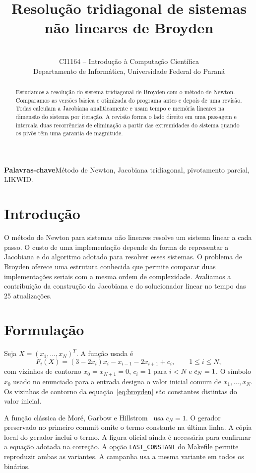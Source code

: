 \documentclass[11pt,a4paper]{article}
\title{\textbf{Resolução tridiagonal de sistemas\\não lineares de Broyden}}
\author{\Autores\ifx\Autores\empty\else\\[3pt]\fi
  \small CI1164 -- Introdução à Computação Científica\\
  \small Departamento de Informática, Universidade Federal do Paraná}
\date{\small\EstadoRelatorio}
\begin{document}
\maketitle

\begin{abstract}
Estudamos a resolução do sistema tridiagonal de Broyden com o método de Newton. Comparamos as versões básica e otimizada do programa antes e depois de uma revisão. Todas calculam a Jacobiana analiticamente e usam tempo e memória lineares na dimensão do sistema por iteração. A revisão forma o lado direito em uma passagem e intercala duas recorrências de eliminação a partir das extremidades do sistema quando os pivôs têm uma garantia de magnitude. \ResumoMedido
\end{abstract}

\noindent\textbf{Palavras-chave}\quad Método de Newton, Jacobiana tridiagonal, pivotamento parcial, LIKWID.

\section{Introdução}

O método de Newton para sistemas não lineares resolve um sistema linear a cada passo. O custo de uma implementação depende da forma de representar a Jacobiana e do algoritmo adotado para resolver esses sistemas. O problema de Broyden oferece uma estrutura conhecida que permite comparar duas implementações seriais com a mesma ordem de complexidade. Avaliamos a contribuição da construção da Jacobiana e do solucionador linear no tempo das 25 atualizações.

\section{Formulação}

Seja $X=(x_1,\ldots,x_N)^T$. A função usada é
\begin{equation}
F_i(X)=(3-2x_i)x_i-x_{i-1}-2x_{i+1}+c_i,\qquad 1\le i\le N,
\label{eq:broyden}
\end{equation}
com vizinhos de contorno $x_0=x_{N+1}=0$, $c_i=1$ para $i<N$ e $c_N=1$. O símbolo $x_0$ usado no enunciado para a entrada designa o valor inicial comum de $x_1,\ldots,x_N$. Os vizinhos de contorno da equação~\eqref{eq:broyden} são constantes distintas do valor inicial.

A função clássica de Moré, Garbow e Hillstrom~\cite{more} usa $c_N=1$. O gerador preservado no primeiro commit omite o termo constante na última linha. A cópia local do gerador inclui o termo. A figura oficial ainda é necessária para confirmar a equação adotada na correção. A opção \texttt{LAST\_CONSTANT} do Makefile permite reproduzir ambas as variantes. A campanha usa a mesma variante em todos os binários.
\end{document}
